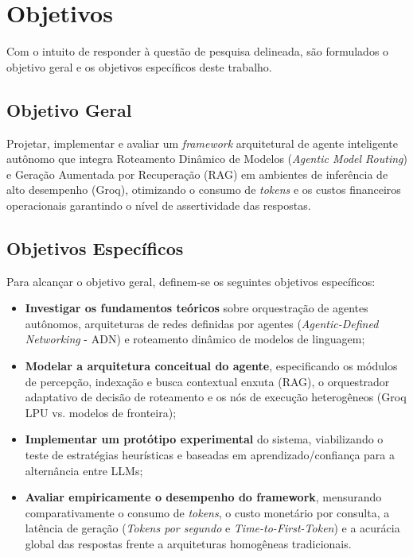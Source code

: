 \section{Objetivos}

Com o intuito de responder à questão de pesquisa delineada, são formulados o objetivo geral e os objetivos específicos deste trabalho.

\subsection{Objetivo Geral}

Projetar, implementar e avaliar um \textit{framework} arquitetural de agente inteligente autônomo que integra Roteamento Dinâmico de Modelos (\textit{Agentic Model Routing}) e Geração Aumentada por Recuperação (RAG) em ambientes de inferência de alto desempenho (Groq), otimizando o consumo de \textit{tokens} e os custos financeiros operacionais garantindo o nível de assertividade das respostas.

\subsection{Objetivos Específicos}

Para alcançar o objetivo geral, definem-se os seguintes objetivos específicos:

\begin{itemize}
    \item \textbf{Investigar os fundamentos teóricos} sobre orquestração de agentes autônomos, arquiteturas de redes definidas por agentes (\textit{Agentic-Defined Networking} - ADN) e roteamento dinâmico de modelos de linguagem;
    \item \textbf{Modelar a arquitetura conceitual do agente}, especificando os módulos de percepção, indexação e busca contextual enxuta (RAG), o orquestrador adaptativo de decisão de roteamento e os nós de execução heterogêneos (Groq LPU vs. modelos de fronteira);
    \item \textbf{Implementar um protótipo experimental} do sistema, viabilizando o teste de estratégias heurísticas e baseadas em aprendizado/confiança para a alternância entre LLMs;
    \item \textbf{Avaliar empiricamente o desempenho do framework}, mensurando comparativamente o consumo de \textit{tokens}, o custo monetário por consulta, a latência de geração (\textit{Tokens por segundo} e \textit{Time-to-First-Token}) e a acurácia global das respostas frente a arquiteturas homogêneas tradicionais.
\end{itemize}

